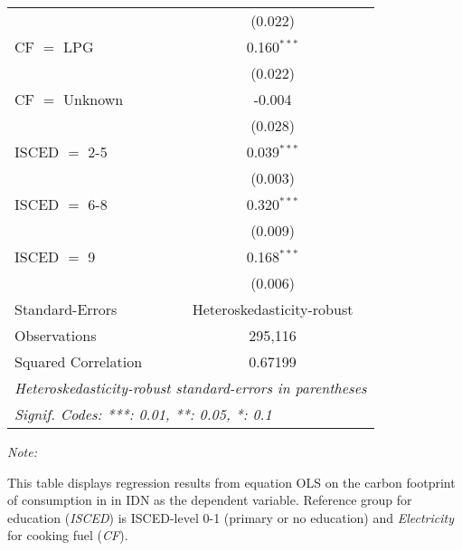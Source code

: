 \begin{table}[htbp!]
\begin{adjustbox}{width = 1\textwidth, max height = 0.95\textheight, center}
\begin{threeparttable}[b]
\begin{tabular}{lc}
                                & (0.022)\\   
            CF $=$ LPG          & 0.160$^{***}$\\   
                                & (0.022)\\   
            CF $=$ Unknown      & -0.004\\   
                                & (0.028)\\   
            ISCED $=$ 2-5       & 0.039$^{***}$\\   
                                & (0.003)\\   
            ISCED $=$ 6-8       & 0.320$^{***}$\\   
                                & (0.009)\\   
            ISCED $=$ 9         & 0.168$^{***}$\\   
                                & (0.006)\\   
            \midrule 
            Standard-Errors     & Heteroskedasticity-robust \\   
            Observations        & 295,116\\  
            Squared Correlation & 0.67199\\  
            \midrule \midrule
            \multicolumn{2}{l}{\emph{Heteroskedasticity-robust standard-errors in parentheses}}\\
            \multicolumn{2}{l}{\emph{Signif. Codes: ***: 0.01, **: 0.05, *: 0.1}}\\
         \end{tabular}
         
         \begin{tablenotes}\item \medskip \textit{Note:}
            \item This table displays regression results from equation OLS on the carbon footprint of consumption in  in IDN as the dependent variable.  Reference group for education (\textit{ISCED}) is ISCED-level 0-1 (primary or no education) and \textit{Electricity} for cooking fuel (\textit{CF}).
         \end{tablenotes}
      \end{threeparttable}
   \end{adjustbox}
\end{table}


